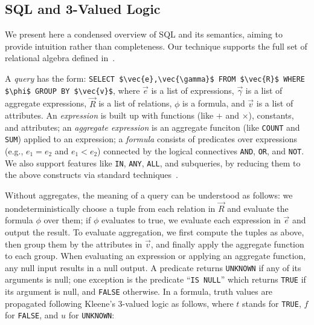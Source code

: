 \documentclass[sigconf,nonacm]{acmart}
\begin{document}
\subsection{SQL and 3-Valued Logic}
We present here a condensed overview of SQL and its semantics,
 aiming to provide intuition rather than completeness.
Our technique supports the full set of relational algebra 
 defined in~\cite{DBLP:conf/pods/LibkinP23}.

A {\em query} has the form:
%
\lstinline[mathescape=true]|SELECT $\vec{e},\vec{\gamma}$ FROM $\vec{R}$ WHERE $\phi$ GROUP BY $\vec{v}$|,
%
where $\vec{e}$ is a list of expressions,
 $\vec{\gamma}$ is a list of aggregate expressions,
 $\vec{R}$ is a list of relations,
 $\phi$ is a formula,
 and $\vec{v}$ is a list of attributes.
An {\em expression} is built up with functions 
 (like $+$ and $\times$),
 constants, and attributes;
 an {\em aggregate expression} is an
 aggregate funciton 
 (like \lstinline[mathescape=true]|COUNT| 
 and \lstinline[mathescape=true]|SUM|)
 applied to an expression;
 a {\em formula} consists of predicates over expressions
 (e.g., $e_1 = e_2$ and $e_1 < e_2$) 
 connected by the logical connectives 
 \lstinline|AND|,
 \lstinline|OR|, and
 \lstinline|NOT|.
We also support features like 
 \lstinline|IN|,
 \lstinline|ANY|, 
 \lstinline|ALL|,
 and subqueries, 
 by reducing them to the above constructs
 via standard techniques~\cite{DBLP:conf/pods/LibkinP23, DBLP:conf/btw/0001K15}.
 
Without aggregates, the meaning of a query can be understood
 as follows:
 we nondeterministically choose a tuple
 from each relation in $\vec{R}$ 
 and evaluate the formula $\phi$ over them;
 if $\phi$ evaluates to true,
 we evaluate each expression in $\vec{e}$ and output the result.
To evaluate aggregation,
 we first compute the tuples as above,
 then group them by the attributes in $\vec{v}$,
 and finally apply the aggregate function to each group.
When evaluating an expression or applying an aggregate function, 
 any null input results in a null output.
A predicate returns \lstinline|UNKNOWN| if 
 any of its arguments is null;
 one exception is the predicate ``\lstinline|IS NULL|''
 which returns \lstinline|TRUE| if its argument is null,
 and \lstinline|FALSE| otherwise.
In a formula, truth values are propagated
 following Kleene's 3-valued logic as follows, 
 where $t$ stands for \lstinline|TRUE|, 
 $f$ for \lstinline|FALSE|, and $u$ for \lstinline|UNKNOWN|:
\end{document}
